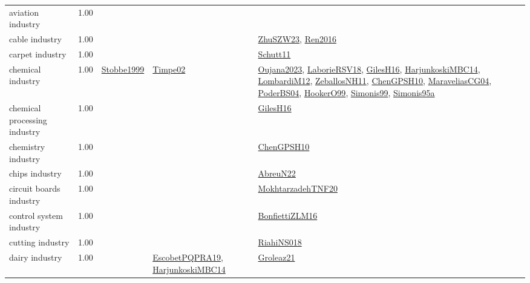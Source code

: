 {\begin{longtable}{p{3cm}r>{\raggedright\arraybackslash}p{6cm}>{\raggedright\arraybackslash}p{6cm}>{\raggedright\arraybackslash}p{8cm}}
\index{aviation industry}\index{Industries!aviation industry}aviation industry &  1.00 &  &  & \\
\index{cable industry}\index{Industries!cable industry}cable industry &  1.00 &  &  & \hyperref[detail:ZhuSZW23]{ZhuSZW23}, \hyperref[detail:Ren2016]{Ren2016}\\
\index{carpet industry}\index{Industries!carpet industry}carpet industry &  1.00 &  &  & \hyperref[detail:Schutt11]{Schutt11}\\
\index{chemical industry}\index{Industries!chemical industry}chemical industry &  1.00 & \hyperref[detail:Stobbe1999]{Stobbe1999} & \hyperref[detail:Timpe02]{Timpe02} & \hyperref[detail:Oujana2023]{Oujana2023}, \hyperref[detail:LaborieRSV18]{LaborieRSV18}, \hyperref[detail:GilesH16]{GilesH16}, \hyperref[detail:HarjunkoskiMBC14]{HarjunkoskiMBC14}, \hyperref[detail:LombardiM12]{LombardiM12}, \hyperref[detail:ZeballosNH11]{ZeballosNH11}, \hyperref[detail:ChenGPSH10]{ChenGPSH10}, \hyperref[detail:MaraveliasCG04]{MaraveliasCG04}, \hyperref[detail:PoderBS04]{PoderBS04}, \hyperref[detail:HookerO99]{HookerO99}, \hyperref[detail:Simonis99]{Simonis99}, \hyperref[detail:Simonis95a]{Simonis95a}\\
\index{chemical processing industry}\index{Industries!chemical processing industry}chemical processing industry &  1.00 &  &  & \hyperref[detail:GilesH16]{GilesH16}\\
\index{chemistry industry}\index{Industries!chemistry industry}chemistry industry &  1.00 &  &  & \hyperref[detail:ChenGPSH10]{ChenGPSH10}\\
\index{chips industry}\index{Industries!chips industry}chips industry &  1.00 &  &  & \hyperref[detail:AbreuN22]{AbreuN22}\\
\index{circuit boards industry}\index{Industries!circuit boards industry}circuit boards industry &  1.00 &  &  & \hyperref[detail:MokhtarzadehTNF20]{MokhtarzadehTNF20}\\
\index{control system industry}\index{Industries!control system industry}control system industry &  1.00 &  &  & \hyperref[detail:BonfiettiZLM16]{BonfiettiZLM16}\\
\index{cutting industry}\index{Industries!cutting industry}cutting industry &  1.00 &  &  & \hyperref[detail:RiahiNS018]{RiahiNS018}\\
\index{dairy industry}\index{Industries!dairy industry}dairy industry &  1.00 &  & \hyperref[detail:EscobetPQPRA19]{EscobetPQPRA19}, \hyperref[detail:HarjunkoskiMBC14]{HarjunkoskiMBC14} & \hyperref[detail:Groleaz21]{Groleaz21}\\

\end{longtable}}
